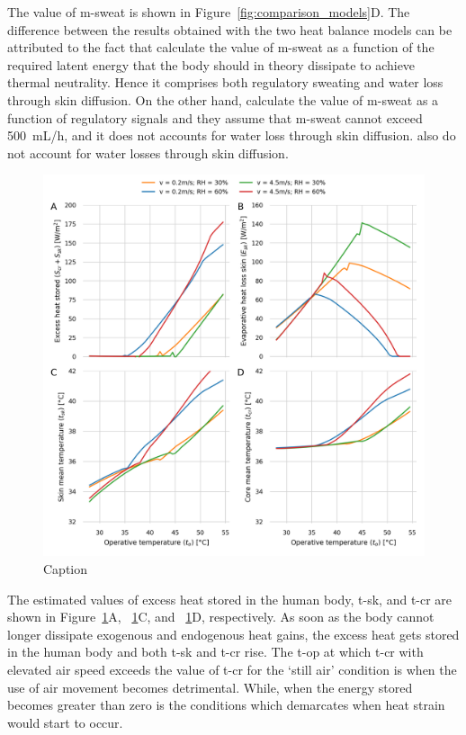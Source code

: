 The value of \ac{m-sweat} is shown in Figure~\ref{fig:comparison_models}D\@.
The difference between the results obtained with the two heat balance models can be attributed to the fact that \citeauthor{Jay2015} calculate the value of \ac{m-sweat} as a function of the required latent energy that the body should in theory dissipate to achieve thermal neutrality.
Hence it comprises both regulatory sweating and water loss through skin diffusion.
On the other hand, \citeauthor{GaggeSET} calculate the value of \ac{m-sweat} as a function of regulatory signals and they assume that \ac{m-sweat} cannot exceed 500~mL/h, and it does not accounts for water loss through skin diffusion.
\citeauthor{GaggeSET} also do not account for water losses through skin diffusion.

\begin{figure}[thb!]
    \centering
    \includegraphics[width=\textwidth]{figures/results_model_2.png}
    \caption{Caption}
    \label{fig:results_model_2}
\end{figure}

The estimated values of excess heat stored in the human body, \ac{t-sk}, and \ac{t-cr} are shown in Figure~\ref{fig:results_model_2}A, ~\ref{fig:results_model_2}C, and ~\ref{fig:results_model_2}D, respectively.
As soon as the body cannot longer dissipate exogenous and endogenous heat gains, the excess heat gets stored in the human body and both \ac{t-sk} and \ac{t-cr} rise.
The \ac{t-op} at which \ac{t-cr} with elevated air speed exceeds the value of \ac{t-cr} for the `still air' condition is when the use of air movement becomes detrimental.
While, when the energy stored becomes greater than zero is the conditions which demarcates when heat strain would start to occur.

